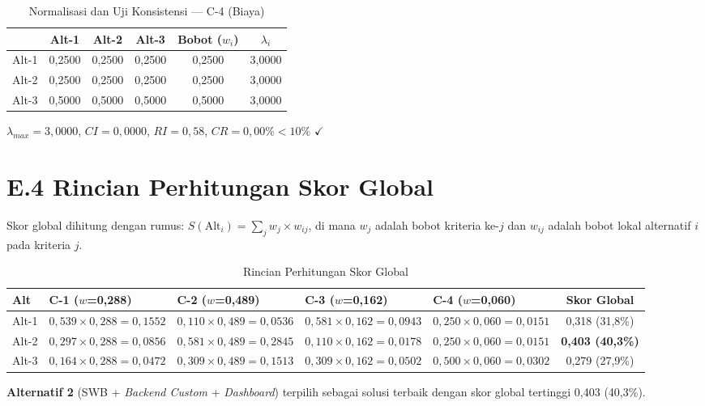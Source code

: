 \begin{table}[H]
  \caption{Normalisasi dan Uji Konsistensi --- C-4 (Biaya)}
  \label{tab:norm-c4}
  \centering
  \begin{tabular}{| l | c | c | c | c | c |}
    \hline
    & \textbf{Alt-1} & \textbf{Alt-2} & \textbf{Alt-3} & \textbf{Bobot ($w_i$)} & \textbf{$\lambda_i$} \\
    \hline
    Alt-1 & 0,2500 & 0,2500 & 0,2500 & 0,2500 & 3,0000 \\
    \hline
    Alt-2 & 0,2500 & 0,2500 & 0,2500 & 0,2500 & 3,0000 \\
    \hline
    Alt-3 & 0,5000 & 0,5000 & 0,5000 & 0,5000 & 3,0000 \\
    \hline
  \end{tabular}
\end{table}

$\lambda_{max} = 3{,}0000$, $CI = 0{,}0000$, $RI = 0{,}58$, $CR = 0{,}00\% < 10\%$ $\checkmark$

\section*{E.4 Rincian Perhitungan Skor Global}

Skor global dihitung dengan rumus: $S(\text{Alt}_i) = \sum_j w_j \times w_{ij}$, di mana $w_j$ adalah bobot kriteria ke-$j$ dan $w_{ij}$ adalah bobot lokal alternatif $i$ pada kriteria $j$.

\begin{table}[H]
  \caption{Rincian Perhitungan Skor Global}
  \label{tab:skor-global-detail}
  \begin{tabularx}{\textwidth}{| l | X | X | X | X | c |}
    \hline
    \textbf{Alt} & \textbf{C-1 ($w$=0,288)} & \textbf{C-2 ($w$=0,489)} & \textbf{C-3 ($w$=0,162)} & \textbf{C-4 ($w$=0,060)} & \textbf{Skor Global} \\
    \hline
    Alt-1 & $0{,}539 \times 0{,}288 = 0{,}1552$ & $0{,}110 \times 0{,}489 = 0{,}0536$ & $0{,}581 \times 0{,}162 = 0{,}0943$ & $0{,}250 \times 0{,}060 = 0{,}0151$ & 0,318 (31,8\%) \\
    \hline
    Alt-2 & $0{,}297 \times 0{,}288 = 0{,}0856$ & $0{,}581 \times 0{,}489 = 0{,}2845$ & $0{,}110 \times 0{,}162 = 0{,}0178$ & $0{,}250 \times 0{,}060 = 0{,}0151$ & \textbf{0,403 (40,3\%)} \\
    \hline
    Alt-3 & $0{,}164 \times 0{,}288 = 0{,}0472$ & $0{,}309 \times 0{,}489 = 0{,}1513$ & $0{,}309 \times 0{,}162 = 0{,}0502$ & $0{,}500 \times 0{,}060 = 0{,}0302$ & 0,279 (27,9\%) \\
    \hline
  \end{tabularx}
\end{table}

\textbf{Alternatif 2} (SWB + \textit{Backend Custom} + \textit{Dashboard}) terpilih sebagai solusi terbaik dengan skor global tertinggi 0,403 (40,3\%).